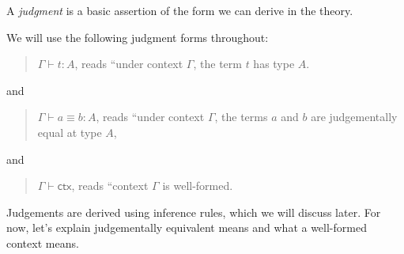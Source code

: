 \documentclass{article}
\newcommand{\Type}{\ensuremath{\mathsf{Type}}}
\newcommand{\Nat}{\mathsf{Nat}}
\newcommand{\emptyctx}{\cdot}              %
\newcommand{\ctx}{\mathsf{ctx}}            %
\newcommand{\judg}[3]{#1 \vdash #2 : #3}   %
\begin{document}
A \emph{judgment} is a basic assertion of the form we can derive in the theory.  

We will use the following judgment forms throughout:
\begin{quote}
  \(\judg{\Gamma}{t}{A}\), reads “under context \(\Gamma\), the term \(t\) has type \(A\).
\end{quote}
and
\begin{quote}
  \(\judg{\Gamma}{a \equiv b }{A}\), reads “under context \(\Gamma\), the terms \(a\) and \(b\) are judgementally equal at type \(A\),
\end{quote}
and 
\begin{quote}
  \(\Gamma \vdash \ctx\), reads “context \(\Gamma\) is well-formed.
\end{quote}
Judgements are derived using inference rules, which we will discuss later. For now, let's explain judgementally equivalent means and what a well-formed context means. 





\end{document}
